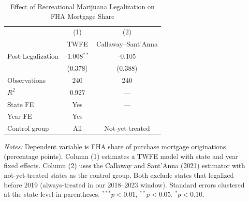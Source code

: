 \begin{table}[t]
\centering
\caption{Effect of Recreational Marijuana Legalization on FHA Mortgage Share}
\label{tab:main}
\begin{tabular}{lcc}
\hline\hline
 & (1) & (2) \\
 & TWFE & Callaway--Sant'Anna \\
\hline
\addlinespace
Post-Legalization & -1.008$^{**}$ & -0.105 \\
 & (0.378) & (0.388) \\
\addlinespace
Observations & 240 & 240 \\
$R^2$ & 0.927 & --- \\
State FE & Yes & --- \\
Year FE & Yes & --- \\
Control group & All & Not-yet-treated \\
\hline\hline
\end{tabular}
\begin{tablenotes}
\small
\item \textit{Notes:} Dependent variable is FHA share of purchase mortgage originations (percentage points). Column (1) estimates a TWFE model with state and year fixed effects. Column (2) uses the Callaway and Sant'Anna (2021) estimator with not-yet-treated states as the control group. Both exclude states that legalized before 2019 (always-treated in our 2018--2023 window). Standard errors clustered at the state level in parentheses. $^{***}p<0.01$, $^{**}p<0.05$, $^{*}p<0.10$.
\end{tablenotes}
\end{table}
